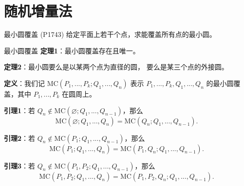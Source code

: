 \documentclass{beamer}
\begin{document}
\section{随机增量法}

\begin{frame}{最小圆覆盖 (P1743)}
    给定平面上若干个点，求能覆盖所有点的最小圆。
\end{frame}

\begin{frame}{最小圆覆盖}
    \footnotesize
    \textbf{定理1}：最小圆覆盖存在且唯一。

    \vspace{1em}\pause
    \textbf{定理2}：最小圆要么是以某两个点为直径的圆，
    要么是某三个点的外接圆。

    \vspace{1em}\pause
    \textbf{定义}：我们记 $\text{MC}(P_1,...,P_k;Q_1,...,Q_n)$ 表示
    $P_1,...,P_k,Q_1,...,Q_n$ 的最小圆覆盖，其中 $P_1,...,P_k$ 在圆周上。

    \vspace{1em}\pause
    \textbf{引理1}：若 $Q_n\notin \text{MC}(\varnothing;Q_1,...,Q_{n-1})$，那么
    \begin{equation*}
        \text{MC}(\varnothing;Q_1,...,Q_{n})=\text{MC}(Q_n;Q_1,...,Q_{n-1}).
    \end{equation*}

    \vspace{1em}\pause
    \textbf{引理2}：若 $Q_n\notin \text{MC}(P_1;Q_1,...,Q_{n-1})$，那么
    \begin{equation*}
        \text{MC}(P_1;Q_1,...,Q_{n})=\text{MC}(P_1,Q_n;Q_1,...,Q_{n-1}).
    \end{equation*}

    \vspace{1em}\pause
    \textbf{引理3}：若 $Q_n\notin \text{MC}(P_1,P_2;Q_1,...,Q_{n-1})$，那么
    \begin{equation*}
        \text{MC}(P_1,P_2;Q_1,...,Q_{n})=\text{MC}(P_1,P_2,Q_n;Q_1,...,Q_{n-1}).
    \end{equation*}
\end{frame}
\end{document}
